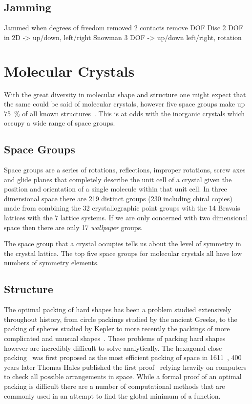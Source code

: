\subsection{Jamming}
Jammed when degrees of freedom removed
2 contacts remove DOF
Disc 2 DOF in 2D -> up/down, left/right
Snowman 3 DOF -> up/down left/right, rotation

\section{Molecular Crystals}

With the great diversity in molecular shape and structure one might expect that the same could be said of molecular crystals, however five space groups make up \SI{75}{\percent} of all known structures~\cite{brock:94}. This is at odds with the inorganic crystals which occupy a wide range of space groups.

\subsection{Space Groups}

Space groups are a series of rotations, reflections, improper rotations, screw axes and glide planes that completely describe the unit cell of a crystal given the position and orientation of a single molecule within that unit cell. In three dimensional space there are 219 distinct groups (230 including chiral copies) made from combining the 32 crystallographic point groups with the 14 Bravais lattices with the 7 lattice systems. If we are only concerned with two dimensional space then there are only 17 {\em wallpaper} groups.

The space group that a crystal occupies tells us about the level of symmetry in the crystal lattice. The top five space groups for molecular crystals all have low numbers of symmetry elements.

\subsection{Structure}

The optimal packing of hard shapes has been a problem studied extensively throughout history, from circle packings studied by the ancient Greeks, to the packing of spheres studied by Kepler to more recently the packings of more complicated and unusual shapes~\cite{atkinson:12,torquato:12}. These problems of packing hard shapes however are incredibly difficult to solve analytically. The hexagonal close packing~ was first proposed as the most efficient packing of space in 1611~\cite{kepler:1611}, 400 years later Thomas Hales published the first proof~\cite{hales:05,hales:14} relying heavily on computers to check all possible arrangements in space. While a formal proof of an optimal packing is difficult there are a number of computational methods that are commonly used in an attempt to find the global minimum of a function.

